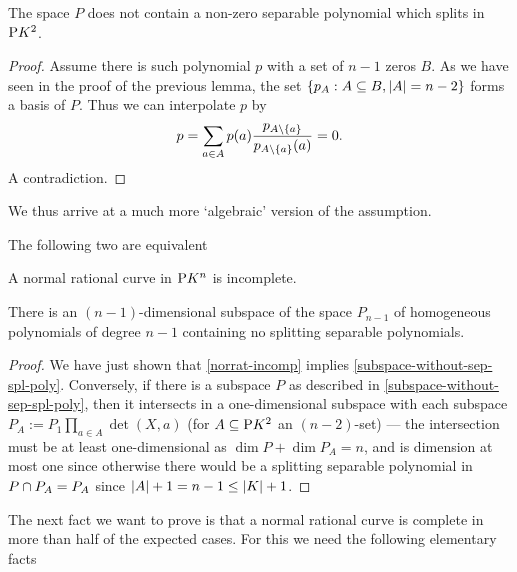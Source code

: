 \begin{lemma}
    The space $P$ does not contain a non-zero separable polynomial which splits in $\P K^2$.
\end{lemma}

\begin{proof}
    Assume there is such polynomial $p$ with a set of $n-1$ zeros $B$.
    As we have seen in the proof of the previous lemma, the set $\set{p_A:A\setleq B,\card A=n-2}$ forms a basis of $P$. Thus we can interpolate $p$ by
    $$
    p=\sum_{a\in A}{p(a)\frac{p_{A\setminus\set{a}}}{p_{A\setminus\set{a}}(a)}}=0.
    $$
    A contradiction.
\end{proof}

We thus arrive at a much more `algebraic' version of the assumption. 

\begin{lemma}\label{char-incomp-nor-rat-curve}
    The following two are equivalent
    \begin{statements}
            \item A normal rational curve in $\P K^n$ is incomplete.\label{norrat-incomp}
            \item There is an $(n-1)$-dimensional subspace of the space $P_{n-1}$ of homogeneous polynomials of degree $n-1$ containing no splitting separable polynomials.\label{subspace-without-sep-spl-poly}
    \end{statements}
\end{lemma}

\begin{proof}
    We have just shown that \autoref{norrat-incomp} implies \autoref{subspace-without-sep-spl-poly}. Conversely, if there is a subspace $P$ as described in \autoref{subspace-without-sep-spl-poly}, then it intersects in a one-dimensional subspace with each subspace $P_A:=P_1\prod_{a\in A}{\det(X,a)}$ (for $A\setleq \P K^2$ an $(n-2)$-set) --- the intersection must be at least one-dimensional as $\dim P +\dim P_A=n$, and is dimension at most one since otherwise there would be a splitting separable polynomial in $P\cap P_A=P_A$ since $\left\vert{A}\right\vert + 1 = n-1\leq \left\vert{K}\right\vert+1$.
\end{proof}


The next fact we want to prove is that a normal rational curve is complete in more than half of the expected cases.
For this we need the following elementary facts

